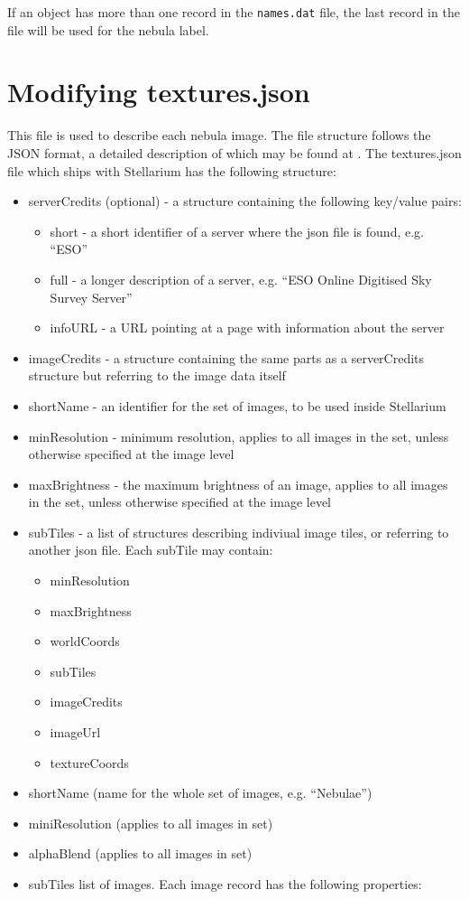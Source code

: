 If an object has more than one record in the \texttt{names.dat} file,
the last record in the file will be used for the nebula label.

\section{Modifying textures.json}\label{modifying-textures.json}

This file is used to describe each nebula image. The file structure
follows the JSON format, a detailed description of which may be found at
. The textures.json file which ships with Stellarium has the following
structure:

\begin{itemize}
\item
  serverCredits (optional) - a structure containing the following
  key/value pairs:

  \begin{itemize}
  \item
    short - a short identifier of a server where the json file is found,
    e.g. ``ESO''
  \item
    full - a longer description of a server, e.g. ``ESO Online Digitised
    Sky Survey Server''
  \item
    infoURL - a URL pointing at a page with information about the server
  \end{itemize}
\item
  imageCredits - a structure containing the same parts as a
  serverCredits structure but referring to the image data itself
\item
  shortName - an identifier for the set of images, to be used inside
  Stellarium
\item
  minResolution - minimum resolution, applies to all images in the set,
  unless otherwise specified at the image level
\item
  maxBrightness - the maximum brightness of an image, applies to all
  images in the set, unless otherwise specified at the image level
\item
  subTiles - a list of structures describing indiviual image tiles, or
  referring to another json file. Each subTile may contain:

  \begin{itemize}
  \item
    minResolution
  \item
    maxBrightness
  \item
    worldCoords
  \item
    subTiles
  \item
    imageCredits
  \item
    imageUrl
  \item
    textureCoords
  \end{itemize}
\item
  shortName (name for the whole set of images, e.g. ``Nebulae'')
\item
  miniResolution (applies to all images in set)
\item
  alphaBlend (applies to all images in set)
\item
  subTiles list of images. Each image record has the following
  properties:


\end{itemize}

